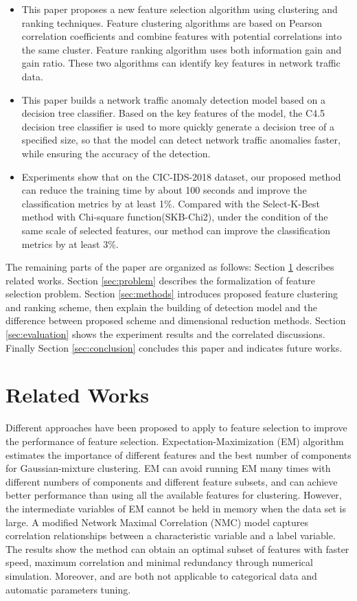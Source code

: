 \documentclass{ieeeaccess}
\theoremstyle{definition}
\begin{document}
\begin{itemize}
    \item This paper proposes a new feature selection algorithm using clustering and ranking techniques. Feature clustering algorithms are based on Pearson correlation coefficients and combine features with potential correlations into the same cluster. Feature ranking algorithm uses both information gain and gain ratio. These two algorithms can identify key features in network traffic data.
    \item This paper builds a network traffic anomaly detection model based on a decision tree classifier. Based on the key features of the model, the C4.5 decision tree classifier is used to more quickly generate a decision tree of a specified size, so that the model can detect network traffic anomalies faster, while ensuring the accuracy of the detection.
    \item Experiments show that on the CIC-IDS-2018 dataset, our proposed method can reduce the training time by about 100 seconds and improve the classification metrics by at least 1\%. Compared with the Select-K-Best method with Chi-square function(SKB-Chi2), under the condition of the same scale of selected features, our method can improve the classification metrics by at least 3\%.
\end{itemize}

The remaining parts of the paper are organized as follows: Section \ref{sec:related} describes related works. Section \ref{sec:problem} describes the formalization of feature selection problem. Section \ref{sec:methods} introduces proposed feature clustering and ranking scheme, then explain the building of detection model and the difference between proposed scheme and dimensional reduction methods. Section \ref{sec:evaluation} shows the experiment results and the correlated discussions. Finally Section \ref{sec:conclusion} concludes this paper and indicates future works.

\section{Related Works}
\label{sec:related}

Different approaches have been proposed to apply to feature selection to improve the performance of feature selection. Expectation-Maximization (EM)\cite{Law2004} algorithm estimates the importance of different features and the best number of components for Gaussian-mixture clustering. EM can avoid running EM many times with different numbers of components and different feature subsets, and can achieve better performance than using all the available features for clustering. However, the intermediate variables of EM cannot be held in memory when the data set is large. A modified Network Maximal Correlation (NMC) model\cite{Yang2018} captures correlation relationships between a characteristic variable and a label variable. The results show the method can obtain an optimal subset of features with faster speed, maximum correlation and minimal redundancy through numerical simulation. Moreover, \cite{Law2004} and \cite{Yang2018} are both not applicable to categorical data and automatic parameters tuning.
\end{document}
